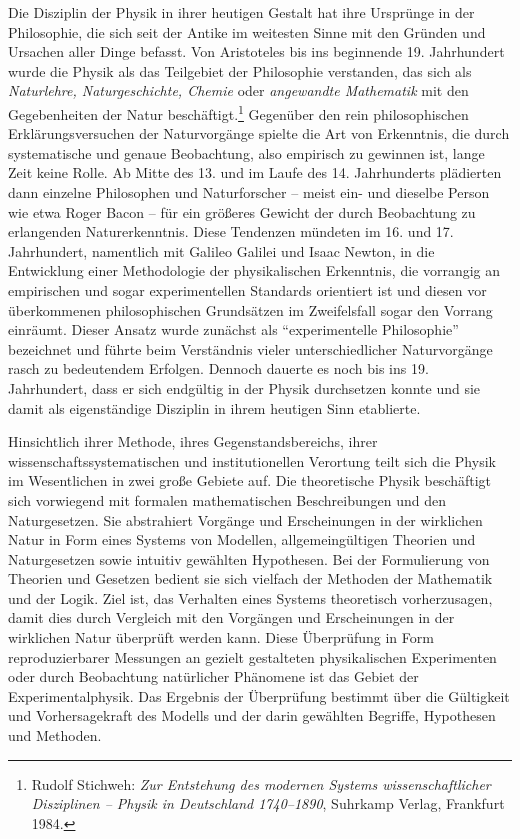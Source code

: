 \documentclass[titlepage, parkskip=full, twocolumn, landscape]{scrartcl}
\begin{document}
Die Disziplin der Physik in ihrer heutigen Gestalt hat ihre Ursprünge in der Philosophie, die sich seit der Antike im weitesten Sinne mit den Gründen und Ursachen aller Dinge befasst. Von Aristoteles bis ins beginnende 19. Jahrhundert wurde die Physik als das Teilgebiet der Philosophie verstanden, das sich als \emph{Naturlehre, Naturgeschichte, Chemie} oder \emph{angewandte Mathematik} mit den Gegebenheiten der Natur beschäftigt.\footnote{Rudolf Stichweh: \emph{Zur Entstehung des modernen Systems wissenschaftlicher Disziplinen -- Physik in Deutschland 1740--1890}, Suhrkamp Verlag, Frankfurt 1984.} Gegenüber den rein philosophischen Erklärungsversuchen der Naturvorgänge spielte die Art von Erkenntnis, die durch systematische und genaue Beobachtung, also empirisch zu gewinnen ist, lange Zeit keine Rolle. Ab Mitte des 13. und im Laufe des 14. Jahrhunderts plädierten dann einzelne Philosophen und Naturforscher -- meist ein- und dieselbe Person wie etwa Roger Bacon -- für ein größeres Gewicht der durch Beobachtung zu erlangenden Naturerkenntnis. Diese Tendenzen mündeten im 16. und 17. Jahrhundert, namentlich mit Galileo Galilei und Isaac Newton, in die Entwicklung einer Methodologie der physikalischen Erkenntnis, die vorrangig an empirischen und sogar experimentellen Standards orientiert ist und diesen vor überkommenen philosophischen Grundsätzen im Zweifelsfall sogar den Vorrang einräumt. Dieser Ansatz wurde zunächst als "`experimentelle Philosophie"' bezeichnet und führte beim Verständnis vieler unterschiedlicher Naturvorgänge rasch zu bedeutendem Erfolgen. Dennoch dauerte es noch bis ins 19. Jahrhundert, dass er sich endgültig in der Physik durchsetzen konnte und sie damit als eigenständige Disziplin in ihrem heutigen Sinn etablierte.

Hinsichtlich ihrer Methode, ihres Gegenstandsbereichs, ihrer wissenschaftssystematischen und institutionellen Verortung teilt sich die Physik im Wesentlichen in zwei große Gebiete auf. Die theoretische Physik beschäftigt sich vorwiegend mit formalen mathematischen Beschreibungen und den Naturgesetzen. Sie abstrahiert Vorgänge und Erscheinungen in der wirklichen Natur in Form eines Systems von Modellen, allgemeingültigen Theorien und Naturgesetzen sowie intuitiv gewählten Hypothesen. Bei der Formulierung von Theorien und Gesetzen bedient sie sich vielfach der Methoden der Mathematik und der Logik. Ziel ist, das Verhalten eines Systems theoretisch vorherzusagen, damit dies durch Vergleich mit den Vorgängen und Erscheinungen in der wirklichen Natur überprüft werden kann. Diese Überprüfung in Form reproduzierbarer Messungen an gezielt gestalteten physikalischen Experimenten oder durch Beobachtung natürlicher Phänomene ist das Gebiet der Experimentalphysik. Das Ergebnis der Überprüfung bestimmt über die Gültigkeit und Vorhersagekraft des Modells und der darin gewählten Begriffe, Hypothesen und Methoden.
\end{document}
